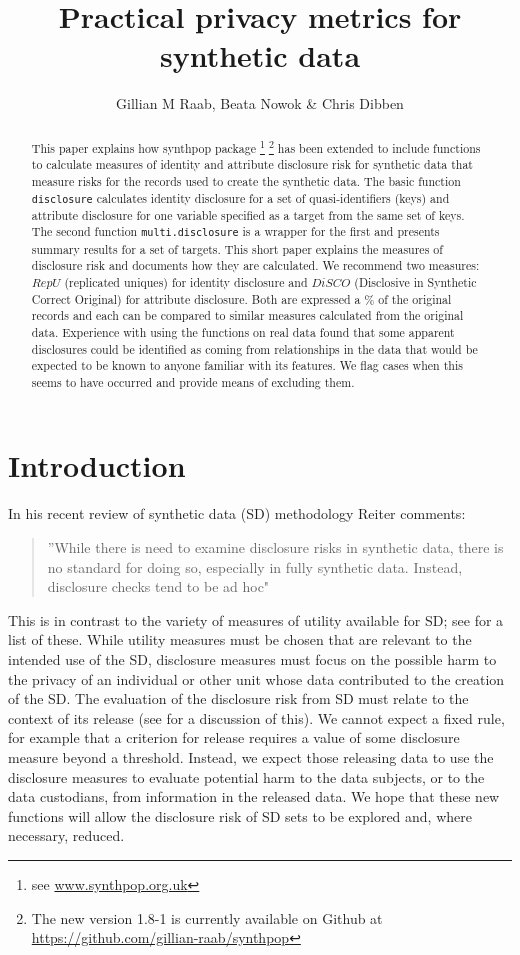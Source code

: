 \documentclass[12pt]{article}
\title{Practical privacy metrics for synthetic data}
\author{Gillian M Raab, Beata Nowok \& Chris Dibben}
\renewcommand{\baselinestretch}{1.5} %
\begin{document}



\maketitle
\begin{abstract}
This paper explains how synthpop package \footnote{see \url{www.synthpop.org.uk} } \footnote{The new version 1.8-1 is currently available on Github at \url{https://github.com/gillian-raab/synthpop}} has been extended to include functions to calculate measures of identity and attribute disclosure risk for synthetic data that measure risks for the 
records used to create the synthetic data. The basic function \texttt{disclosure} calculates identity disclosure for a set of quasi-identifiers (keys) and attribute disclosure for one variable specified as a target from the same set of keys. The second function \texttt{multi.disclosure} is a wrapper for the first and presents summary results for a set of targets. This short paper explains the measures of disclosure risk and documents how they are calculated. We recommend two measures: $RepU$ (replicated uniques) for identity
disclosure and $DiSCO$ (Disclosive in Synthetic Correct Original) for attribute disclosure. Both
are expressed a \% of the original records and each can be compared to similar measures calculated from the original data.
Experience with using the functions on real data found that some apparent disclosures could be identified as coming from relationships 
in the data that would be expected to be known to anyone familiar with its features. We flag cases when this seems to have occurred and provide means of excluding them.

\end{abstract}
\section{Introduction}
\renewcommand{\baselinestretch}{1.5} 
In his recent review of synthetic data (SD) methodology Reiter \cite{reiter2023}
comments: 
\begin{quote}
''While there is need to examine disclosure risks in synthetic data, there is no standard for
doing so, especially in fully synthetic data. Instead, disclosure checks tend to be ad hoc"
\end{quote}
This is in contrast to the variety of measures of utility available for SD; see \cite{raab2021} for a list of these. While utility measures must be chosen that are relevant to the intended use of the SD, disclosure measures must focus on the possible harm to the privacy of an individual or other unit whose data contributed to the creation of the SD. The evaluation of the disclosure risk from SD must relate to the context of its release (see \cite{elliotanonframe} for a discussion of this). We cannot expect a fixed rule, for example that a criterion for release requires a value of some disclosure measure beyond a threshold. Instead, we expect those releasing data to use the disclosure measures to evaluate potential harm to the data subjects, or to the data custodians, from information in the released data. We hope that these new functions will allow the disclosure risk of SD sets to be explored and, where necessary, reduced. 
\end{document}
